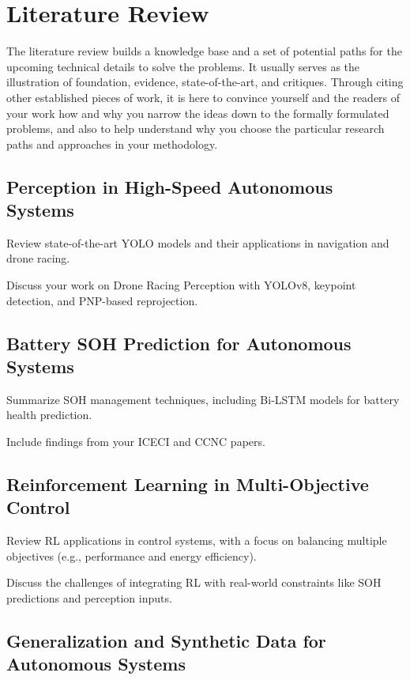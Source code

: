 \chapter{Literature Review}\label{ch:2}
\minitoc

The literature review builds a knowledge base and a set of potential paths for the upcoming technical details to solve the problems.
It usually serves as the illustration of foundation, evidence, state-of-the-art, and critiques.
Through citing other established pieces of work, it is here to convince yourself and the readers of your work how and why you narrow the ideas down to the formally formulated problems,
and also to help understand why you choose the particular research paths and approaches in your methodology.

\newpage


\section{Perception in High-Speed Autonomous Systems}

Review state-of-the-art YOLO models and their applications in navigation and drone racing.

Discuss your work on Drone Racing Perception with YOLOv8, keypoint detection, and PNP-based reprojection.


\section{Battery SOH Prediction for Autonomous Systems}

Summarize SOH management techniques, including Bi-LSTM models for battery health prediction.

Include findings from your ICECI and CCNC papers.


\section{Reinforcement Learning in Multi-Objective Control}

Review RL applications in control systems, with a focus on balancing multiple objectives (e.g., performance and energy efficiency).

Discuss the challenges of integrating RL with real-world constraints like SOH predictions and perception inputs.


\section{Generalization and Synthetic Data for Autonomous Systems}

